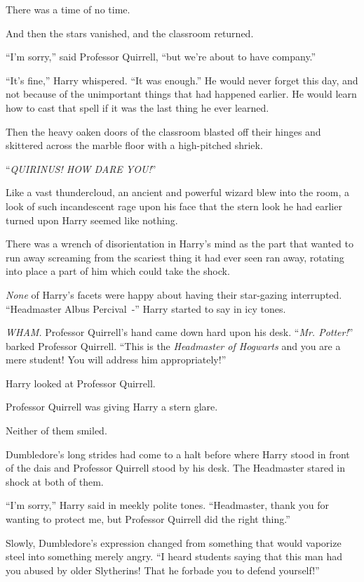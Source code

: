 There was a time of no time.

And then the stars vanished, and the classroom returned.

``I'm sorry,'' said Professor Quirrell, ``but we're about to have company.''

``It's fine,'' Harry whispered. ``It was enough.'' He would never forget this day, and not because of the unimportant things that had happened earlier. He would learn how to cast that spell if it was the last thing he ever learned.

Then the heavy oaken doors of the classroom blasted off their hinges and skittered across the marble floor with a high-pitched shriek.

``\emph{QUIRINUS! HOW DARE YOU!}''

Like a vast thundercloud, an ancient and powerful wizard blew into the room, a look of such incandescent rage upon his face that the stern look he had earlier turned upon Harry seemed like nothing.

There was a wrench of disorientation in Harry's mind as the part that wanted to run away screaming from the scariest thing it had ever seen ran away, rotating into place a part of him which could take the shock.

\emph{None} of Harry's facets were happy about having their star-gazing interrupted. ``Headmaster Albus Percival~-'' Harry started to say in icy tones.

\emph{WHAM.} Professor Quirrell's hand came down hard upon his desk. ``\emph{Mr. Potter!}'' barked Professor Quirrell. ``This is the \emph{Headmaster of Hogwarts} and you are a mere student! You will address him appropriately!''

Harry looked at Professor Quirrell.

Professor Quirrell was giving Harry a stern glare.

Neither of them smiled.

Dumbledore's long strides had come to a halt before where Harry stood in front of the dais and Professor Quirrell stood by his desk. The Headmaster stared in shock at both of them.

``I'm sorry,'' Harry said in meekly polite tones. ``Headmaster, thank you for wanting to protect me, but Professor Quirrell did the right thing.''

Slowly, Dumbledore's expression changed from something that would vaporize steel into something merely angry. ``I heard students saying that this man had you abused by older Slytherins! That he forbade you to defend yourself!''

